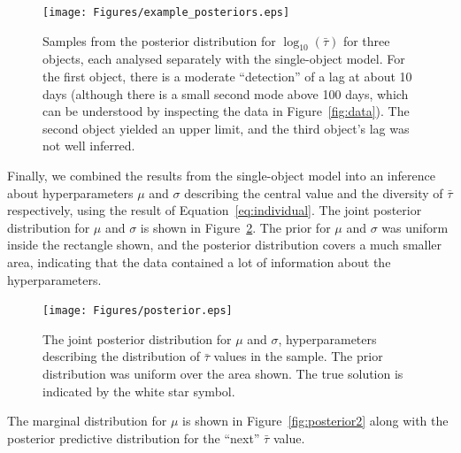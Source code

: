 \documentclass[useAMS,usenatbib]{mn2e}
\begin{document}
\begin{figure}
\begin{center}
\texttt{[image: Figures/example\_posteriors.eps]}
\caption{Samples from the posterior distribution for $\log_{10}(\bar{\tau})$
for three objects, each analysed separately with the single-object model. For
the first object, there is a moderate ``detection'' of a lag at about 10 days
(although there is a small second mode above 100 days, which can be understood
by inspecting the data in Figure~\ref{fig:data}).
The second object yielded an upper limit, and the third object's lag was
not well inferred.
\label{fig:example_posteriors}}
\end{center}
\end{figure}

Finally, we combined the results from the single-object model into an inference
about hyperparameters $\mu$ and $\sigma$ describing the central value and
the diversity of $\bar{\tau}$ respectively, using the result of
Equation~\ref{eq:individual}. The joint posterior distribution for $\mu$ and
$\sigma$ is shown in Figure~\ref{fig:posterior}. The prior for $\mu$ and $\sigma$
was uniform inside the rectangle shown, and the posterior distribution covers
a much smaller area, indicating that the data contained a lot of information
about the hyperparameters.

\begin{figure}
\begin{center}
\texttt{[image: Figures/posterior.eps]}
\caption{The joint posterior distribution for $\mu$ and $\sigma$, hyperparameters
describing the distribution of $\bar{\tau}$ values in the sample. The prior
distribution was uniform over the area shown.
The true solution is indicated by the white star symbol.\label{fig:posterior}}
\end{center}
\end{figure}

The marginal distribution for $\mu$ is shown in Figure~\ref{fig:posterior2}
along with the posterior predictive distribution for the ``next'' $\bar{\tau}$
value.
\end{document}
